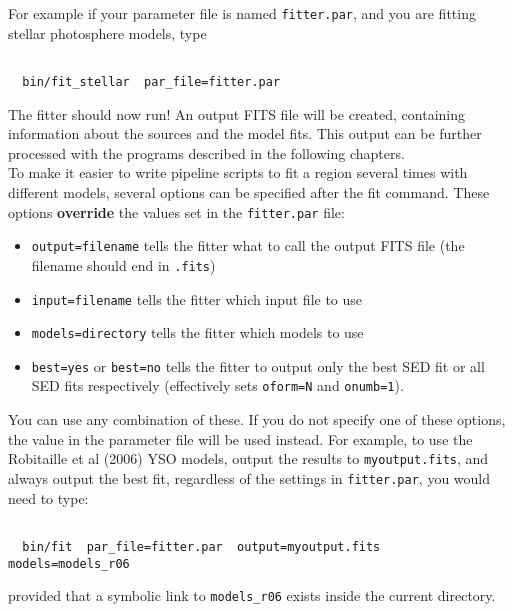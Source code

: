 \documentclass[letterpaper,11pt]{report}
\begin{document}
For example if your parameter file is named \texttt{fitter.par}, and you are fitting stellar photosphere models, type

\begin{Verbatim}[frame=single,label=Example 1]

  bin/fit_stellar  par_file=fitter.par

\end{Verbatim}

The fitter should now run! An output FITS file will be created, containing information about the sources and the model fits. This output can be further processed with the programs described in the following chapters.\\

To make it easier to write pipeline scripts to fit a region several times with different models, several options can be specified after the fit command. These options {\bf override} the values set in the \texttt{fitter.par} file:

\begin{itemize}
\item \texttt{output=filename} tells the fitter what to call the output FITS file (the filename should end in \texttt{.fits})
\item \texttt{input=filename} tells the fitter which input file to use
\item \texttt{models=directory} tells the fitter which models to use
\item \texttt{best=yes} or \texttt{best=no} tells the fitter to output only the best SED fit or all SED fits respectively (effectively sets \texttt{oform=N} and \texttt{onumb=1}).
\end{itemize}


You can use any combination of these. If you do not specify one of these options, the value in the parameter file will be used instead. For example, to use the Robitaille et al (2006) YSO models, output the results to \texttt{myoutput.fits}, and always output the best fit, regardless of the settings in \texttt{fitter.par}, you would need to type:

\begin{Verbatim}[frame=single,label=Example 2]

  bin/fit  par_file=fitter.par  output=myoutput.fits  models=models_r06  

\end{Verbatim}

provided that a symbolic link to \texttt{models\_r06} exists inside the current directory.
\end{document}
